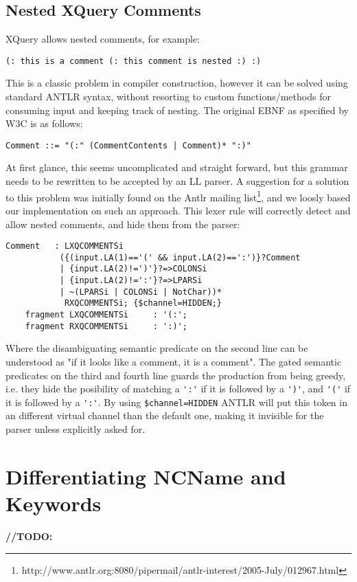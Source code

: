 \subsection{Nested XQuery Comments}
XQuery allows nested comments, for example:
\begin{verbatim}
(: this is a comment (: this comment is nested :) :)
\end{verbatim}
This is a classic problem in compiler construction, however it can be solved using standard ANTLR syntax, without resorting to custom functions/methods for consuming input and keeping track of nesting. The original EBNF as specified by W3C is as follows:
\begin{verbatim}
Comment ::= "(:" (CommentContents | Comment)* ":)"
\end{verbatim}
At first glance, this seems uncomplicated and straight forward, but this grammar needs to be rewritten to be accepted by an LL parser. A suggestion for a solution to this problem was initially found on the Antlr mailing list\footnote{http://www.antlr.org:8080/pipermail/antlr-interest/2005-July/012967.html}, and we loosly based our implementation on such an approach. This lexer rule will correctly detect and allow nested comments, and hide them from the parser:
\begin{verbatim}	
Comment   : LXQCOMMENTSi 
           ({(input.LA(1)=='(' && input.LA(2)==':')}?Comment 
           | {input.LA(2)!=')'}?=>COLONSi
           | {input.LA(2)!=':'}?=>LPARSi
           | ~(LPARSi | COLONSi | NotChar))*
            RXQCOMMENTSi; {$channel=HIDDEN;}
    fragment LXQCOMMENTSi     : '(:';
    fragment RXQCOMMENTSi     : ':)';
\end{verbatim}
Where the disambiguating semantic predicate on the second line can be understood as "if it looks like a comment, it is a comment". The gated semantic predicates on the third and fourth line guards the production from being greedy, i.e. they hide the posibility of matching a \verb!':'! if it is followed by a \verb!')'!, and \verb!'('! if it is followed by a \verb!':'!. By using \verb!$channel=HIDDEN! ANTLR will put this token in an different virtual channel than the default one, making it invisible for the parser unless explicitly asked for. 

\section{Differentiating NCName and Keywords}

\textbf{\LARGE //TODO:} 

